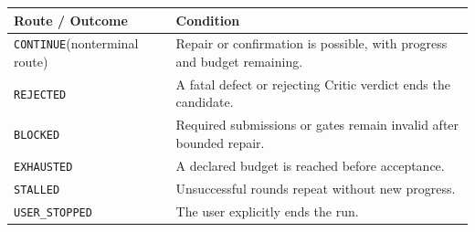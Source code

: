 \begin{tabular}{@{}P{3.5cm}P{9.0cm}@{}}
\toprule
\textbf{Route / Outcome} & \textbf{Condition} \\
\midrule
\texttt{CONTINUE}\newline(nonterminal route) & Repair or confirmation is possible, with progress and budget remaining. \\
\texttt{REJECTED} & A fatal defect or rejecting Critic verdict ends the candidate. \\
\texttt{BLOCKED} & Required submissions or gates remain invalid after bounded repair. \\
\texttt{EXHAUSTED} & A declared budget is reached before acceptance. \\
\texttt{STALLED} & Unsuccessful rounds repeat without new progress. \\
\texttt{USER\_STOPPED} & The user explicitly ends the run. \\
\bottomrule
\end{tabular}
